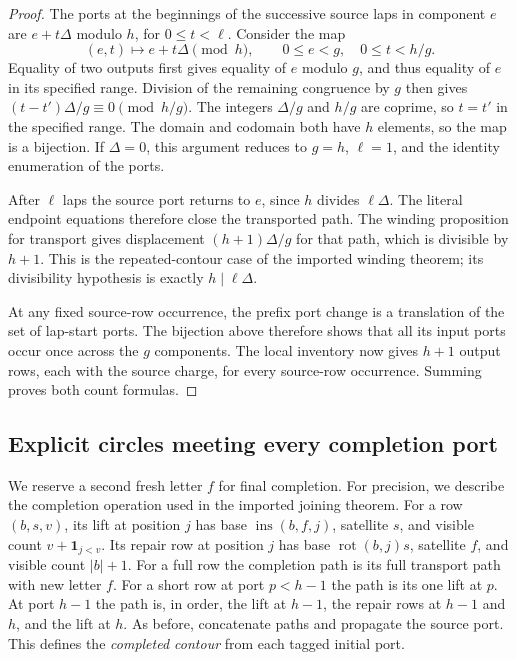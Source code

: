 \begin{proof}
The ports at the beginnings of the successive source laps in component
$e$ are $e+t\Delta$ modulo $h$, for $0\le t<\ell$. Consider the map
\[
 (e,t)\longmapsto e+t\Delta\pmod h,
 \qquad 0\le e<g,\quad 0\le t<h/g.
\]
Equality of two outputs first gives equality of $e$ modulo $g$, and thus
equality of $e$ in its specified range. Division of the remaining
congruence by $g$ then gives
$(t-t')\Delta/g\equiv0\pmod{h/g}$. The integers $\Delta/g$ and $h/g$
are coprime, so $t=t'$ in the specified range. The domain and codomain
both have $h$ elements, so the map is a bijection. If $\Delta=0$, this
argument reduces to $g=h$, $\ell=1$, and the identity enumeration of
the ports.

After $\ell$ laps the source port returns to $e$, since $h$ divides
$\ell\Delta$. The literal endpoint equations therefore close the
transported path. The winding proposition for transport gives displacement
$(h+1)\Delta/g$ for that path, which is divisible by $h+1$. This is the
repeated-contour case of the imported winding theorem; its divisibility
hypothesis is exactly $h\mid\ell\Delta$.

At any fixed source-row occurrence, the prefix port change is a translation
of the set of lap-start ports. The bijection above therefore shows that
all its input ports occur once across the $g$ components. The local
inventory now gives $h+1$ output rows, each with the source charge, for
every source-row occurrence. Summing proves both count formulas.
\end{proof}

\subsection{Explicit circles meeting every completion port}

We reserve a second fresh letter $f$ for final completion. For precision,
we describe the completion operation used in the imported joining theorem.
For a row $(b,s,v)$, its lift at position $j$ has base
$\operatorname{ins}(b,f,j)$, satellite $s$, and visible count
$v+\boldsymbol{1}_{j<v}$. Its repair row at position $j$ has base
$\operatorname{rot}(b,j)s$, satellite $f$, and visible count $|b|+1$.
For a full row the completion path is its full transport path with new
letter $f$. For a short row at port $p<h-1$ the path is its one lift at
$p$. At port $h-1$ the path is, in order, the lift at $h-1$, the repair
rows at $h-1$ and $h$, and the lift at $h$. As before, concatenate paths
and propagate the source port. This defines the \emph{completed contour}
from each tagged initial port.

